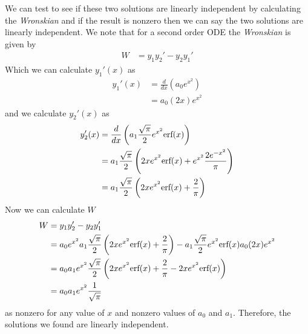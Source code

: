 \documentclass[11pt]{article}
\numberwithin{equation}{section}
\begin{document}
We can test to see if these two solutions are linearly independent by calculating the 
\emph{Wronskian} and if the result is nonzero then we can say the two solutions are linearly 
independent. We note that for a second order ODE the \emph{Wronskian} is given by
\begin{align*}
W &= y_1y_2' - y_2y_1'
\end{align*}
Which we can calculate $y_1'(x)$ as
\begin{align*}
y_1'(x) &= \frac{d}{dx}\left(a_0e^{x^2}\right)\\
&= a_0(2x)e^{x^2}
\end{align*}
and we calculate $y_2'(x)$ as
\begin{align*}
y_2'(x) &= \frac{d}{dx}\left(a_1\frac{\sqrt{\pi}}{2}e^{x^2}\textnormal{erf}(x)\right)\\
&= a_1\frac{\sqrt{\pi}}{2}\left(2xe^{x^2}\textnormal{erf}(x) + e^{x^2}\frac{2e^{-x^2}}{\pi}\right)\\
&= a_1\frac{\sqrt{\pi}}{2}\left(2xe^{x^2}\textnormal{erf}(x) + \frac{2}{\pi}\right)
\end{align*}
Now we can calculate $W$
\begin{align*}
W &= y_1y_2' - y_2y_1'\\
&= a_0e^{x^2}a_1\frac{\sqrt{\pi}}{2}\left(2xe^{x^2}\textnormal{erf}(x) + \frac{2}{\pi}\right) - a_1\frac{\sqrt{\pi}}{2}e^{x^2}\textnormal{erf}(x)a_0(2x)e^{x^2}\\
&= a_0a_1e^{x^2}\frac{\sqrt{\pi}}{2}\left(2xe^{x^2}\textnormal{erf}(x) + \frac{2}{\pi} - 2xe^{x^2}\textnormal{erf}(x)\right)\\
&= a_0a_1e^{x^2}\frac{1}{\sqrt{\pi}}
\end{align*}
as nonzero for any value of $x$ and nonzero values of $a_0$ and $a_1$. Therefore, the 
solutions we found are linearly independent.

\pagebreak
\end{document}
